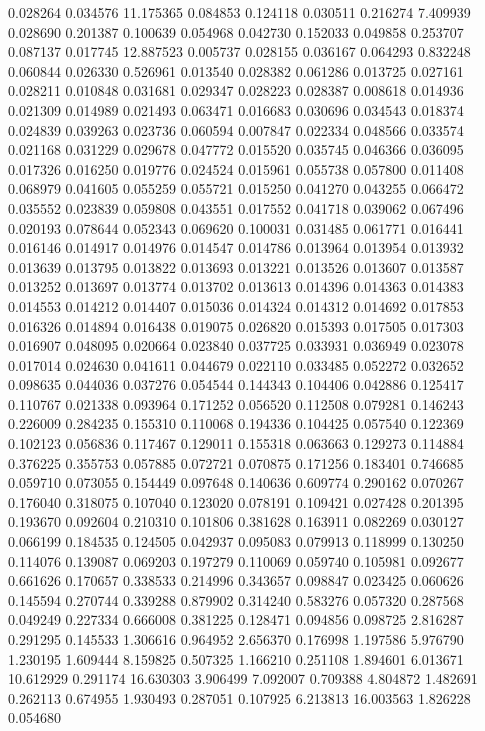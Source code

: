 0.028264
0.034576
11.175365
0.084853
0.124118
0.030511
0.216274
7.409939
0.028690
0.201387
0.100639
0.054968
0.042730
0.152033
0.049858
0.253707
0.087137
0.017745
12.887523
0.005737
0.028155
0.036167
0.064293
0.832248
0.060844
0.026330
0.526961
0.013540
0.028382
0.061286
0.013725
0.027161
0.028211
0.010848
0.031681
0.029347
0.028223
0.028387
0.008618
0.014936
0.021309
0.014989
0.021493
0.063471
0.016683
0.030696
0.034543
0.018374
0.024839
0.039263
0.023736
0.060594
0.007847
0.022334
0.048566
0.033574
0.021168
0.031229
0.029678
0.047772
0.015520
0.035745
0.046366
0.036095
0.017326
0.016250
0.019776
0.024524
0.015961
0.055738
0.057800
0.011408
0.068979
0.041605
0.055259
0.055721
0.015250
0.041270
0.043255
0.066472
0.035552
0.023839
0.059808
0.043551
0.017552
0.041718
0.039062
0.067496
0.020193
0.078644
0.052343
0.069620
0.100031
0.031485
0.061771
0.016441
0.016146
0.014917
0.014976
0.014547
0.014786
0.013964
0.013954
0.013932
0.013639
0.013795
0.013822
0.013693
0.013221
0.013526
0.013607
0.013587
0.013252
0.013697
0.013774
0.013702
0.013613
0.014396
0.014363
0.014383
0.014553
0.014212
0.014407
0.015036
0.014324
0.014312
0.014692
0.017853
0.016326
0.014894
0.016438
0.019075
0.026820
0.015393
0.017505
0.017303
0.016907
0.048095
0.020664
0.023840
0.037725
0.033931
0.036949
0.023078
0.017014
0.024630
0.041611
0.044679
0.022110
0.033485
0.052272
0.032652
0.098635
0.044036
0.037276
0.054544
0.144343
0.104406
0.042886
0.125417
0.110767
0.021338
0.093964
0.171252
0.056520
0.112508
0.079281
0.146243
0.226009
0.284235
0.155310
0.110068
0.194336
0.104425
0.057540
0.122369
0.102123
0.056836
0.117467
0.129011
0.155318
0.063663
0.129273
0.114884
0.376225
0.355753
0.057885
0.072721
0.070875
0.171256
0.183401
0.746685
0.059710
0.073055
0.154449
0.097648
0.140636
0.609774
0.290162
0.070267
0.176040
0.318075
0.107040
0.123020
0.078191
0.109421
0.027428
0.201395
0.193670
0.092604
0.210310
0.101806
0.381628
0.163911
0.082269
0.030127
0.066199
0.184535
0.124505
0.042937
0.095083
0.079913
0.118999
0.130250
0.114076
0.139087
0.069203
0.197279
0.110069
0.059740
0.105981
0.092677
0.661626
0.170657
0.338533
0.214996
0.343657
0.098847
0.023425
0.060626
0.145594
0.270744
0.339288
0.879902
0.314240
0.583276
0.057320
0.287568
0.049249
0.227334
0.666008
0.381225
0.128471
0.094856
0.098725
2.816287
0.291295
0.145533
1.306616
0.964952
2.656370
0.176998
1.197586
5.976790
1.230195
1.609444
8.159825
0.507325
1.166210
0.251108
1.894601
6.013671
10.612929
0.291174
16.630303
3.906499
7.092007
0.709388
4.804872
1.482691
0.262113
0.674955
1.930493
0.287051
0.107925
6.213813
16.003563
1.826228
0.054680
